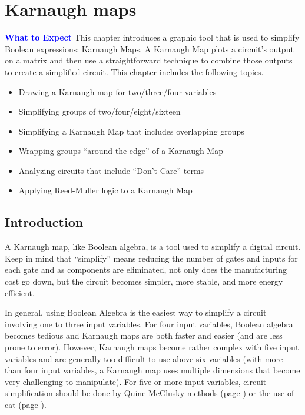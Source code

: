 \chapter{Karnaugh maps}\label{ch06}

\begin{tcolorbox}[colback=blue!5!white,colframe=blue!75!black]
	\textcolor{blue}{\textbf{What to Expect}}
	\tcblower
	This chapter introduces a graphic tool that is used to simplify Boolean expressions: Karnaugh Maps. A Karnaugh Map plots a circuit's output on a matrix and then use a straightforward technique to combine those outputs to create a simplified circuit. This chapter includes the following topics.
	
	\begin{itemize}
		\item Drawing a Karnaugh map for two/three/four variables
		\item Simplifying groups of two/four/eight/sixteen
		\item Simplifying a Karnaugh Map that includes overlapping groups
		\item Wrapping groups ``around the edge'' of a Karnaugh Map
		\item Analyzing circuits that include ``Don't Care'' terms
		\item Applying Reed-Muller logic to a Karnaugh Map
	\end{itemize}
	
\end{tcolorbox}

\section{Introduction}


A Karnaugh map, like Boolean algebra, is a tool used to simplify a digital circuit. Keep in mind that ``simplify'' means reducing the number of gates and inputs for each gate and as components are eliminated, not only does the manufacturing cost go down, but the circuit becomes simpler, more stable, and more energy efficient. 

In general, using Boolean Algebra is the easiest way to simplify a circuit involving one to three input variables. For four input variables, Boolean algebra becomes tedious and Karnaugh maps are both faster and easier (and are less prone to error). However, Karnaugh maps become rather complex with five input variables and are generally too difficult to use above six variables (with more than four input variables, a Karnaugh map uses multiple dimensions that become very challenging to manipulate). For five or more input variables, circuit simplification should be done by Quine-McClusky methods  (page \pageref{ASM:sec:quine-mccluskey_simplification_method}) or the use of \gls{cat} (page \pageref{ASM:sec:automated_tools}).


